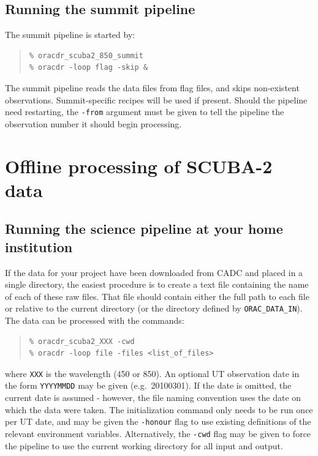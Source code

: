 \documentclass[twoside,11pt]{article}
\newcommand{\xlabel}[1]{}
\renewcommand{\_}{\texttt{\symbol{95}}}
\newenvironment{myquote}{\begin{quote}\begin{small}}{\end{small}\end{quote}}
\begin{document}
\subsection{Running the summit pipeline}

The summit pipeline is started by:
\begin{myquote}
\begin{verbatim}
% oracdr_scuba2_850_summit
% oracdr -loop flag -skip &
\end{verbatim}
\end{myquote}
The summit pipeline reads the data files from flag files, and skips
non-existent observations. Summit-specific recipes will be used if
present. Should the pipeline need restarting, the \verb+-from+
argument must be given to tell the pipeline the observation number it
should begin processing.


\section{\xlabel{offline}Offline processing of SCUBA-2 data\label{se:offline}}

\subsection{Running the science pipeline at your home institution}

If the data for your project have been downloaded from CADC and placed
in a single directory, the easiest procedure is to create a text file
containing the name of each of these raw files. That file should
contain either the full path to each file or relative to the current
directory (or the directory defined by \verb+ORAC_DATA_IN+). The data
can be processed with the commands:
\begin{myquote}
\begin{verbatim}
% oracdr_scuba2_XXX -cwd
% oracdr -loop file -files <list_of_files>
\end{verbatim}
\end{myquote}
where \verb+XXX+ is the wavelength (450 or 850). An optional UT
observation date in the form \verb+YYYYMMDD+ may be given
(e.g.\ 20100301). If the date is omitted, the current date is assumed
- however, the file naming convention uses the date on which the data
were taken. The initialization command only needs to be run once per
UT date, and may be given the \verb+-honour+ flag to use existing
definitions of the relevant environment variables. Alternatively, the
\verb+-cwd+ flag may be given to force the pipeline to use the current
working directory for all input and output.
\end{document}
